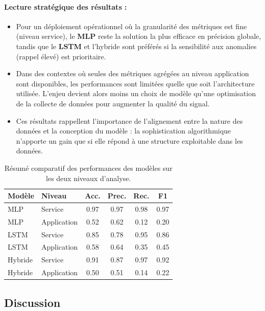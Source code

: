 \documentclass[conference]{IEEEtran}
\begin{document}
\paragraph{Lecture stratégique des résultats :}
\begin{itemize}
    \item Pour un déploiement opérationnel où la granularité des métriques est fine (niveau service), le \textbf{MLP} reste la solution la plus efficace en précision globale, tandis que le \textbf{LSTM} et l’hybride sont préférés si la sensibilité aux anomalies (rappel élevé) est prioritaire.
    \item Dans des contextes où seules des métriques agrégées au niveau application sont disponibles, les performances sont limitées quelle que soit l’architecture utilisée. L’enjeu devient alors moins un choix de modèle qu’une optimisation de la collecte de données pour augmenter la qualité du signal.
    \item Ces résultats rappellent l’importance de l’alignement entre la nature des données et la conception du modèle : la sophistication algorithmique n’apporte un gain que si elle répond à une structure exploitable dans les données.
\end{itemize}

\begin{table}[!t]
\centering
\caption{Résumé comparatif des performances des modèles sur les deux niveaux d'analyse.}
\label{tab:resume-perf}
\begin{tabular}{@{}l l c c c c@{}}
\toprule
\textbf{Modèle} & \textbf{Niveau} & \textbf{Acc.} & \textbf{Prec.} & \textbf{Rec.} & \textbf{F1} \\
\midrule
MLP & Service & 0.97 & 0.97 & 0.98 & 0.97 \\
MLP & Application & 0.52 & 0.62 & 0.12 & 0.20 \\
LSTM & Service & 0.85 & 0.78 & 0.95 & 0.86 \\
LSTM & Application & 0.58 & 0.64 & 0.35 & 0.45 \\
Hybride & Service & 0.91 & 0.87 & 0.97 & 0.92 \\
Hybride & Application & 0.50 & 0.51 & 0.14 & 0.22 \\
\bottomrule
\end{tabular}
\end{table}


\subsection{Discussion}
\end{document}
